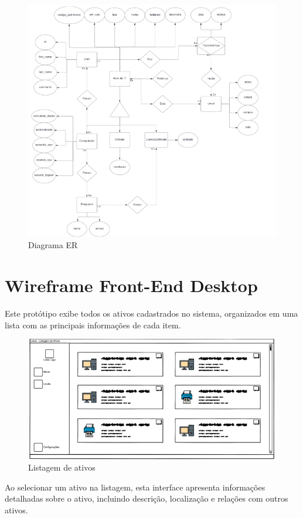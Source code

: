 \begin{figure}[H]
    \centering
    \includegraphics[width=0.8\linewidth]{figuras/DIAGRAMAer.png}
    \caption{Diagrama ER}
    \label{fig:classes}
\end{figure}


\section{Wireframe Front-End Desktop}
Este protótipo exibe todos os ativos cadastrados no sistema, organizados em uma lista com as principais informações de cada item.

\begin{figure}[H]
    \centering
    \includegraphics[width=1\linewidth]{figuras/lsitagemativos.png}
    \caption{Listagem de ativos}
    \label{fig:mockup1}
\end{figure}

Ao selecionar um ativo na listagem, esta interface apresenta informações detalhadas sobre o ativo, incluindo descrição, localização e relações com outros ativos.


